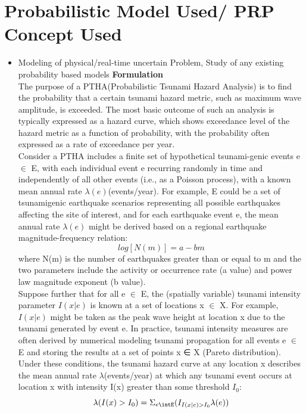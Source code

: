 \documentclass{article}
\begin{document}
\section {Probabilistic Model Used/ PRP Concept Used}
\begin{itemize}

\item Modeling of physical/real-time uncertain Problem, Study of any existing probability based models
\large \textbf{Formulation}\\
The purpose of a PTHA(Probabilistic Tsunami Hazard Analysis) is to find the probability that a certain tsunami hazard metric, such as maximum wave
amplitude, is exceeded. The most basic outcome of such an analysis is typically expressed as a hazard curve,
which shows exceedance level of the hazard metric as a function of probability, with the probability often
expressed as a rate of exceedance per year.\\

Consider a PTHA includes a finite set of hypothetical tsunami-genic events e $\in$ E, with each individual event e recurring randomly in time and independently of all other events (i.e., as a Poisson process), with a known mean annual rate $\lambda(e)$(events/year). For example, E could be a set of
tsunamigenic earthquake scenarios representing all possible earthquakes affecting the site of interest, and for each earthquake event e, the mean annual rate $\lambda(e)$ might be derived based on a regional earthquake
magnitude-frequency relation: $$log[N(m)]=a-bm$$
where N(m) is the number of earthquakes greater than or equal to m and the two parameters include the activity or occurrence rate (a value) and power law magnitude exponent (b value).\\

Suppose further that for all e $\in$ E, the (spatially variable)
tsunami intensity parameter $I(x|e)$ is known at a set of locations x $\in$ X. For example, $I(x|e)$ might be taken as the peak wave height at location x due to the tsunami generated by event e. In practice, tsunami intensity measures are often derived by numerical modeling tsunami propagation for all events e $\in$ E and storing the results at a set of points x ∈ X (Pareto distribution). Under these conditions, the tsunami hazard curve at any location x describes the mean annual rate $\lambda$(events/year) at which any tsunami event occurs at location x with intensity I(x) greater than
some threshold $I_{0}$:
$$\lambda(I(x)>I_{0})=\Sigma_{e\intE}(I_{I(x|e)>I_{0}}\lambda(e))$$


\end{itemize}
\end{document}
